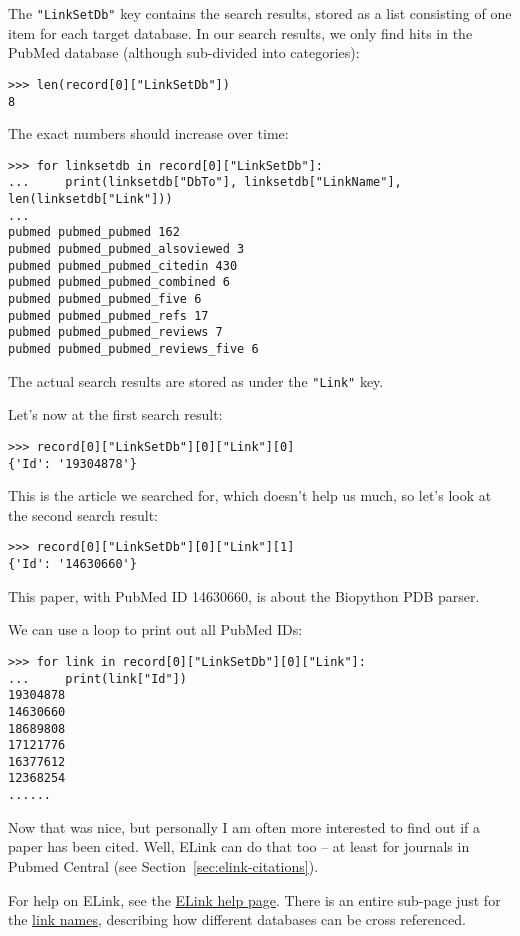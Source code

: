 The \verb+"LinkSetDb"+ key contains the search results, stored as a list consisting of one item for each target database. In our search results, we only find hits in the PubMed database (although sub-divided into categories):

\begin{verbatim}
>>> len(record[0]["LinkSetDb"])
8
\end{verbatim}
\noindent The exact numbers should increase over time:
\begin{verbatim}
>>> for linksetdb in record[0]["LinkSetDb"]:
...     print(linksetdb["DbTo"], linksetdb["LinkName"], len(linksetdb["Link"]))
...
pubmed pubmed_pubmed 162
pubmed pubmed_pubmed_alsoviewed 3
pubmed pubmed_pubmed_citedin 430
pubmed pubmed_pubmed_combined 6
pubmed pubmed_pubmed_five 6
pubmed pubmed_pubmed_refs 17
pubmed pubmed_pubmed_reviews 7
pubmed pubmed_pubmed_reviews_five 6
\end{verbatim}

The actual search results are stored as under the \verb+"Link"+ key.

Let's now at the first search result:
\begin{verbatim}
>>> record[0]["LinkSetDb"][0]["Link"][0]
{'Id': '19304878'}
\end{verbatim}

\noindent This is the article we searched for, which doesn't help us much, so let's look at the second search result:

\begin{verbatim}
>>> record[0]["LinkSetDb"][0]["Link"][1]
{'Id': '14630660'}
\end{verbatim}

\noindent This paper, with PubMed ID 14630660, is about the Biopython PDB parser.

We can use a loop to print out all PubMed IDs:
\begin{verbatim}
>>> for link in record[0]["LinkSetDb"][0]["Link"]:
...     print(link["Id"])
19304878
14630660
18689808
17121776
16377612
12368254
......
\end{verbatim}

Now that was nice, but personally I am often more interested to find out if a paper has been cited.
Well, ELink can do that too -- at least for journals in Pubmed Central (see Section~\ref{sec:elink-citations}).

For help on ELink, see the \href{https://www.ncbi.nlm.nih.gov/books/NBK25499/#chapter4.ELink}{ELink help page}.
There is an entire sub-page just for the \href{https://eutils.ncbi.nlm.nih.gov/corehtml/query/static/entrezlinks.html}{link names}, describing how different databases can be cross referenced.

